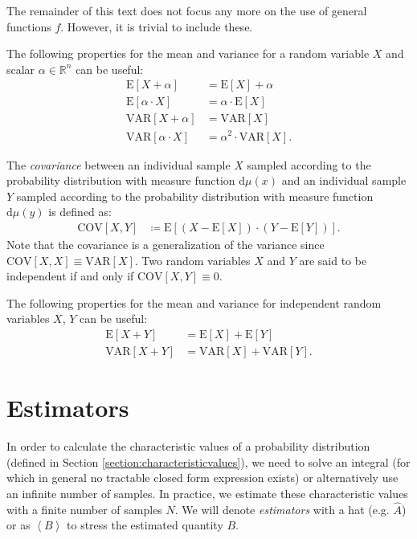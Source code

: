 \documentclass[10pt,a4paper]{article}
\numberwithin{equation}{section}
\begin{document}
The remainder of this text does not focus any more on the use of general functions $f$. However, it is trivial to include these.

The following properties for the mean and variance for a random variable $X$ and scalar $\alpha \in \mathbb{R}^{n}$ can be useful:
\begin{align}
\mathrm{E}\left[X + \alpha\right] 			&= \mathrm{E}\left[X\right] +\alpha \\
\mathrm{E}\left[\alpha \cdot X\right] 		&= \alpha \cdot \mathrm{E}\left[X\right] \\
\mathrm{VAR}\left[X + \alpha\right] 		&= \mathrm{VAR}\left[X\right]\\
\mathrm{VAR}\left[\alpha \cdot X\right] 	&= \alpha^{2} \cdot \mathrm{VAR}\left[X\right].
\end{align}

The \textit{covariance} between an individual sample $X$ sampled according to the probability distribution with measure function $\mathrm{d}\mu\left(x\right)$ and an individual sample $Y$ sampled according to the probability distribution with measure function $\mathrm{d}\mu\left(y\right)$ is defined as:
\begin{align}
\label{equation:COV}\mathrm{COV}\left[X, Y\right] &\coloneqq \mathrm{E}\left[\left(X-\mathrm{E}\left[X\right]\right) \cdot \left(Y-\mathrm{E}\left[Y\right]\right)\right].
\end{align}
Note that the covariance is a generalization of the variance since $\mathrm{COV}\left[X, X\right] \equiv \mathrm{VAR}\left[X\right]$. Two random variables $X$ and $Y$ are said to be independent if and only if $\mathrm{COV}\left[X, Y\right] \equiv 0$.

The following properties for the mean and variance for independent random variables $X$, $Y$ can be useful:
\begin{align}
\mathrm{E}\left[X + Y\right] 		&= \mathrm{E}\left[X\right] + \mathrm{E}\left[Y\right] \\
\mathrm{VAR}\left[X + Y\right] 		&= \mathrm{VAR}\left[X\right] + \mathrm{VAR}\left[Y\right].
\end{align}

\section{Estimators}
\label{section-estimators}
In order to calculate the characteristic values of a probability distribution (defined in Section \ref{section:characteristicvalues}), we need to solve an integral (for which in general no tractable closed form expression exists) or alternatively use an infinite number of samples. In practice, we estimate these characteristic values with a finite number of samples $N$. We will denote \textit{estimators} with a hat (e.g. $\widehat{A}$) or as $\left<B\right>$ to stress the estimated quantity $B$.
\end{document}
